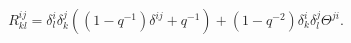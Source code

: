 \begin{equation}
R_{kl}^{ij}=\delta _{l}^{i}\delta _{k}^{j}\left( \left( 1-q^{-1}\right)
\delta ^{ij}+q^{-1}\right) +\left( 1-q^{-2}\right) \delta _{k}^{i}\delta
_{l}^{j}\Theta ^{ji}.  
\end{equation}

